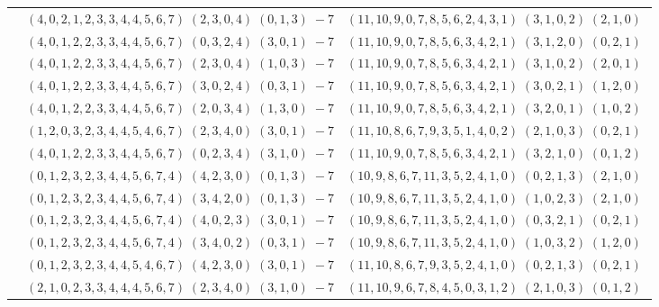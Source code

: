 \documentclass[11pt]{article}
\begin{document}
\begin{longtable}[l]{|c|c|c|}
 \cline{2-3} 
 & $(4 ,0 ,2 ,1 ,2 ,3 ,3 ,4 ,4 ,5 ,6 ,7) \;(2 ,3 ,0 ,4) \;(0 ,1 ,3) \;-7$ & $(11 ,10 ,9 ,0 ,7 ,8 ,5 ,6 ,2 ,4 ,3 ,1) \;(3 ,1 ,0 ,2) \;(2 ,1 ,0) \;$\\ 
 \cline{2-3} 
 & $(4 ,0 ,1 ,2 ,2 ,3 ,3 ,4 ,4 ,5 ,6 ,7) \;(0 ,3 ,2 ,4) \;(3 ,0 ,1) \;-7$ & $(11 ,10 ,9 ,0 ,7 ,8 ,5 ,6 ,3 ,4 ,2 ,1) \;(3 ,1 ,2 ,0) \;(0 ,2 ,1) \;$\\ 
 \cline{2-3} 
 & $(4 ,0 ,1 ,2 ,2 ,3 ,3 ,4 ,4 ,5 ,6 ,7) \;(2 ,3 ,0 ,4) \;(1 ,0 ,3) \;-7$ & $(11 ,10 ,9 ,0 ,7 ,8 ,5 ,6 ,3 ,4 ,2 ,1) \;(3 ,1 ,0 ,2) \;(2 ,0 ,1) \;$\\ 
 \cline{2-3} 
 & $(4 ,0 ,1 ,2 ,2 ,3 ,3 ,4 ,4 ,5 ,6 ,7) \;(3 ,0 ,2 ,4) \;(0 ,3 ,1) \;-7$ & $(11 ,10 ,9 ,0 ,7 ,8 ,5 ,6 ,3 ,4 ,2 ,1) \;(3 ,0 ,2 ,1) \;(1 ,2 ,0) \;$\\ 
 \cline{2-3} 
 & $(4 ,0 ,1 ,2 ,2 ,3 ,3 ,4 ,4 ,5 ,6 ,7) \;(2 ,0 ,3 ,4) \;(1 ,3 ,0) \;-7$ & $(11 ,10 ,9 ,0 ,7 ,8 ,5 ,6 ,3 ,4 ,2 ,1) \;(3 ,2 ,0 ,1) \;(1 ,0 ,2) \;$\\ 
 \cline{2-3} 
 & $(1 ,2 ,0 ,3 ,2 ,3 ,4 ,4 ,5 ,4 ,6 ,7) \;(2 ,3 ,4 ,0) \;(3 ,0 ,1) \;-7$ & $(11 ,10 ,8 ,6 ,7 ,9 ,3 ,5 ,1 ,4 ,0 ,2) \;(2 ,1 ,0 ,3) \;(0 ,2 ,1) \;$\\ 
 \cline{2-3} 
 & $(4 ,0 ,1 ,2 ,2 ,3 ,3 ,4 ,4 ,5 ,6 ,7) \;(0 ,2 ,3 ,4) \;(3 ,1 ,0) \;-7$ & $(11 ,10 ,9 ,0 ,7 ,8 ,5 ,6 ,3 ,4 ,2 ,1) \;(3 ,2 ,1 ,0) \;(0 ,1 ,2) \;$\\ 
 \cline{2-3} 
 & $(0 ,1 ,2 ,3 ,2 ,3 ,4 ,4 ,5 ,6 ,7 ,4) \;(4 ,2 ,3 ,0) \;(0 ,1 ,3) \;-7$ & $(10 ,9 ,8 ,6 ,7 ,11 ,3 ,5 ,2 ,4 ,1 ,0) \;(0 ,2 ,1 ,3) \;(2 ,1 ,0) \;$\\ 
 \cline{2-3} 
 & $(0 ,1 ,2 ,3 ,2 ,3 ,4 ,4 ,5 ,6 ,7 ,4) \;(3 ,4 ,2 ,0) \;(0 ,1 ,3) \;-7$ & $(10 ,9 ,8 ,6 ,7 ,11 ,3 ,5 ,2 ,4 ,1 ,0) \;(1 ,0 ,2 ,3) \;(2 ,1 ,0) \;$\\ 
 \cline{2-3} 
 & $(0 ,1 ,2 ,3 ,2 ,3 ,4 ,4 ,5 ,6 ,7 ,4) \;(4 ,0 ,2 ,3) \;(3 ,0 ,1) \;-7$ & $(10 ,9 ,8 ,6 ,7 ,11 ,3 ,5 ,2 ,4 ,1 ,0) \;(0 ,3 ,2 ,1) \;(0 ,2 ,1) \;$\\ 
 \cline{2-3} 
 & $(0 ,1 ,2 ,3 ,2 ,3 ,4 ,4 ,5 ,6 ,7 ,4) \;(3 ,4 ,0 ,2) \;(0 ,3 ,1) \;-7$ & $(10 ,9 ,8 ,6 ,7 ,11 ,3 ,5 ,2 ,4 ,1 ,0) \;(1 ,0 ,3 ,2) \;(1 ,2 ,0) \;$\\ 
 \cline{2-3} 
 & $(0 ,1 ,2 ,3 ,2 ,3 ,4 ,4 ,5 ,4 ,6 ,7) \;(4 ,2 ,3 ,0) \;(3 ,0 ,1) \;-7$ & $(11 ,10 ,8 ,6 ,7 ,9 ,3 ,5 ,2 ,4 ,1 ,0) \;(0 ,2 ,1 ,3) \;(0 ,2 ,1) \;$\\ 
 \cline{2-3} 
 & $(2 ,1 ,0 ,2 ,3 ,3 ,4 ,4 ,4 ,5 ,6 ,7) \;(2 ,3 ,4 ,0) \;(3 ,1 ,0) \;-7$ & $(11 ,10 ,9 ,6 ,7 ,8 ,4 ,5 ,0 ,3 ,1 ,2) \;(2 ,1 ,0 ,3) \;(0 ,1 ,2) \;$\\ 

\end{longtable}
\end{document}
